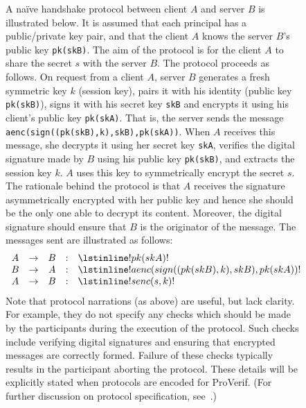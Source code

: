 \documentclass{book}
\newcommand{\A}{A}
\newcommand{\B}{B}
\begin{document}
\begin{figure}
  A na\"{i}ve handshake protocol between client $\A$ and server $\B$ is illustrated
  below. It is assumed that each principal has a public/private key
  pair, and that the client $\A$ knows the server $\B$'s public key \lstinline!pk(skB)!. The aim of
  the protocol is for the client $\A$ to share the secret $s$
  with the server $\B$. The protocol proceeds as follows.
  On request from a client $\A$, server $\B$
  generates a fresh symmetric key $k$ (session key), pairs it with his identity
  (public key \lstinline!pk(skB)!), signs it with his secret key
  \lstinline!skB! and encrypts it using his client's public key \lstinline!pk(skA)!.
  That is, the server sends the message \lstinline!aenc(sign((pk(skB),k),skB),pk(skA))!.
  When $\A$
  receives this message, she decrypts it using her secret key \lstinline!skA!, verifies
  the digital signature made by $\B$ using his public key \lstinline!pk(skB)!, and extracts
  the session key $k$. $\A$ uses
  this key to symmetrically encrypt the secret $s$. The rationale
  behind the protocol is that $\A$ receives the signature asymmetrically
  encrypted with her public key and hence she should be the only one
  able to decrypt its content. Moreover, the digital signature should ensure that $\B$
  is the originator of the message.  The messages sent are illustrated
  as follows:
  \[
  \begin{array}{ccccl}
	\A & \rightarrow & \B &:& \lstinline!pk(skA)! \\
	\B & \rightarrow & \A &:& \lstinline!aenc(sign((pk(skB),k),skB),pk(skA))! \\
	\A & \rightarrow & \B &:& \lstinline!senc(s,k)!
  \end{array}
  \]
  Note that protocol narrations (as above) are useful, but
  lack clarity. For example, they do not specify any checks which should be
  made by the participants during the execution of the protocol.
  Such checks include verifying digital signatures and ensuring
  that encrypted messages are correctly formed. Failure of these checks typically
  results in the participant aborting the protocol.
  These details will be explicitly stated when protocols are encoded for ProVerif.
  (For further discussion on protocol specification, see~\cite{Abadi96,Abadi99c}.)


\end{figure}
\end{document}
